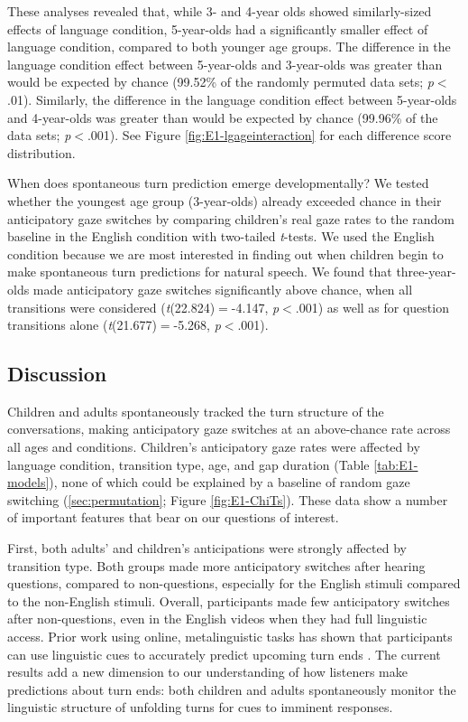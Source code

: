 \documentclass[authoryear, 12pt]{elsarticle}
\begin{document}
These analyses revealed that, while 3- and 4-year olds showed similarly-sized effects of language condition, 5-year-olds had a significantly smaller effect of language condition, compared to both younger age groups. The difference in the language condition effect between 5-year-olds and 3-year-olds was greater than would be expected by chance (99.52\% of the randomly permuted data sets; \textit{p}$<$.01). Similarly, the difference in the language condition effect between 5-year-olds and 4-year-olds was greater than would be expected by chance (99.96\% of the data sets; \textit{p}$<$.001). See Figure \ref{fig:E1-lgageinteraction} for each difference score distribution.

When does spontaneous turn prediction emerge developmentally? We tested whether the youngest age group (3-year-olds) already exceeded chance in their anticipatory gaze switches by comparing children's real gaze rates to the random baseline in the English condition with two-tailed \textit{t}-tests. We used the English condition because we are most interested in finding out when children begin to make spontaneous turn predictions for natural speech. We found that three-year-olds made anticipatory gaze switches significantly above chance, when all transitions were considered (\textit{t}(22.824)$=$-4.147, \textit{p}$<$.001) as well as for question transitions alone (\textit{t}(21.677)$=$-5.268, \textit{p}$<$.001).

\subsection*{Discussion}
\label{sec:discussion1}

Children and adults spontaneously tracked the turn structure of the conversations, making anticipatory gaze switches at an above-chance rate across all ages and conditions. Children's anticipatory gaze rates were affected by language condition, transition type, age, and gap duration (Table \ref{tab:E1-models}), none of which could be explained by a baseline of random gaze switching (\ref{sec:permutation}; Figure \ref{fig:E1-ChiTs}). These data show a number of important features that bear on our questions of interest.

First, both adults' and children's anticipations were strongly affected by transition type. Both groups made more anticipatory switches after hearing questions, compared to non-questions, especially for the English stimuli compared to the non-English stimuli. Overall, participants made few anticipatory switches after non-questions, even in the English videos when they had full linguistic access. Prior work using online, metalinguistic tasks has shown that participants can use linguistic cues to accurately predict upcoming turn ends \citep{bogelstorreira2015, magyari2012, de-ruiter2006}. The current results add a new dimension to our understanding of how listeners make predictions about turn ends: both children and adults spontaneously monitor the linguistic structure of unfolding turns for cues to imminent responses.
\end{document}
